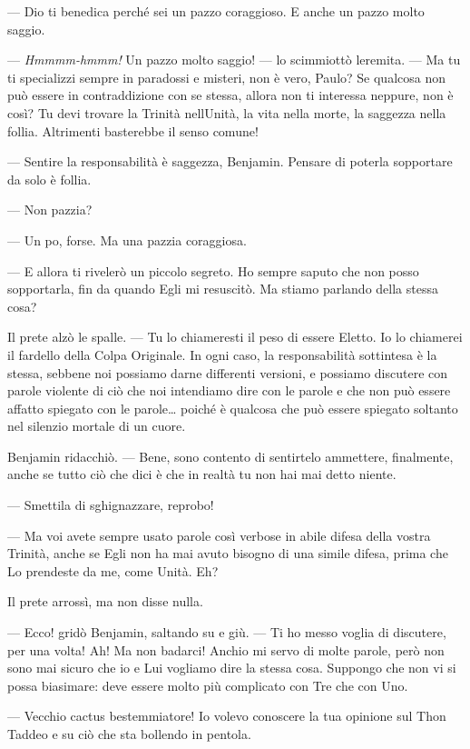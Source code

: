 --- Dio ti benedica perché sei un pazzo coraggioso. E anche un pazzo
molto saggio.

--- \emph{Hmmmm-hmmm!} Un pazzo molto saggio! --- lo scimmiottò
l\textquotesingle eremita. --- Ma tu ti specializzi sempre in paradossi
e misteri, non è vero, Paulo? Se qualcosa non può essere in
contraddizione con se stessa, allora non ti interessa neppure, non è
così? Tu devi trovare la Trinità nell\textquotesingle Unità, la vita
nella morte, la saggezza nella follia. Altrimenti basterebbe il senso
comune!

--- Sentire la responsabilità è saggezza, Benjamin. Pensare di poterla
sopportare da solo è follia.

--- Non pazzia?

--- Un po\textquotesingle, forse. Ma una pazzia coraggiosa.

--- E allora ti rivelerò un piccolo segreto. Ho sempre saputo che non
posso sopportarla, fin da quando Egli mi resuscitò. Ma stiamo parlando
della stessa cosa?

Il prete alzò le spalle. --- Tu lo chiameresti il peso di essere Eletto.
Io lo chiamerei il fardello della Colpa Originale. In ogni caso, la
responsabilità sottintesa è la stessa, sebbene noi possiamo darne
differenti versioni, e possiamo discutere con parole violente di ciò che
noi intendiamo dire con le parole e che non può essere affatto spiegato
con le parole\ldots{} poiché è qualcosa che può essere spiegato soltanto
nel silenzio mortale di un cuore.

Benjamin ridacchiò. --- Bene, sono contento di sentirtelo ammettere,
finalmente, anche se tutto ciò che dici è che in realtà tu non hai mai
detto niente.

--- Smettila di sghignazzare, reprobo!

--- Ma voi avete sempre usato parole così verbose in abile difesa della
vostra Trinità, anche se Egli non ha mai avuto bisogno di una simile
difesa, prima che Lo prendeste da me, come Unità. Eh?

Il prete arrossì, ma non disse nulla.

--- Ecco! gridò Benjamin, saltando su e giù. --- Ti ho messo voglia di
discutere, per una volta! Ah! Ma non badarci! Anch\textquotesingle io mi
servo di molte parole, però non sono mai sicuro che io e Lui vogliamo
dire la stessa cosa. Suppongo che non vi si possa biasimare: deve essere
molto più complicato con Tre che con Uno.

--- Vecchio cactus bestemmiatore! Io volevo conoscere la tua opinione
sul Thon Taddeo e su ciò che sta bollendo in pentola.

